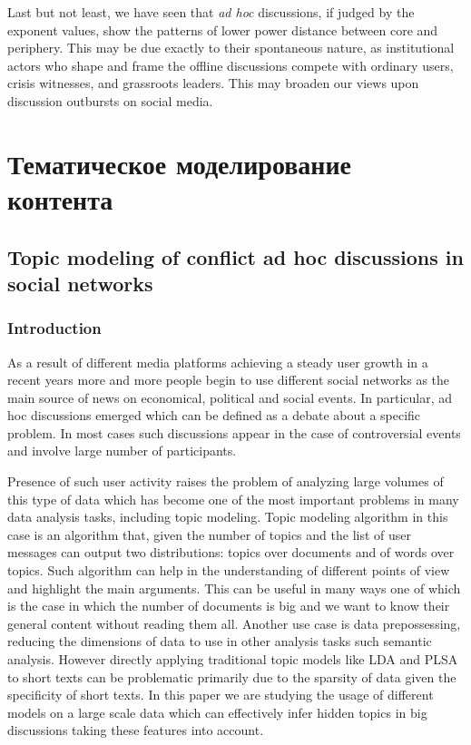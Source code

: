Last but not least, we have seen that \textit{ad hoc} discussions, if judged by the exponent values, show the patterns of lower power distance between core and periphery. This may be due exactly to their spontaneous nature, as institutional actors who shape and frame the offline discussions compete with ordinary users, crisis witnesses, and grassroots leaders. This may broaden our views upon discussion outbursts on social media.

\section{Тематическое моделирование контента}\label{sec:ch5/sect2}

\subsection{Topic modeling of conflict ad hoc discussions in social networks}\label{subsec:ch5/sec2/sub1}

\subsubsection{Introduction}

As a result of different media platforms achieving a steady user growth in a recent years more and more people begin to use different social networks as the main source of news on economical, political and social events. In particular, ad hoc discussions emerged which can be defined as a debate about a specific problem. In most cases such discussions appear in the case of controversial events and involve large number of participants.

Presence of such user activity raises the problem of analyzing large volumes of this type of data which has become one of the most important problems in many data analysis tasks, including topic modeling. Topic modeling algorithm in this case is an algorithm that, given the number of topics and the list of user messages can output two distributions: topics over documents and of words over topics. Such algorithm can help in the understanding of different points of view and highlight the main arguments. This can be useful in many ways one of which is the case in which the number of documents is big and we want to know their general content without reading them all. Another use case is data prepossessing, reducing the dimensions of data to use in other analysis tasks such semantic analysis. However directly applying traditional topic models like LDA and PLSA to short texts can be problematic primarily due to the sparsity of data given the specificity of short texts. In this paper we are studying the usage of different models on a large scale data which can effectively infer hidden topics in big discussions taking these features into account.

